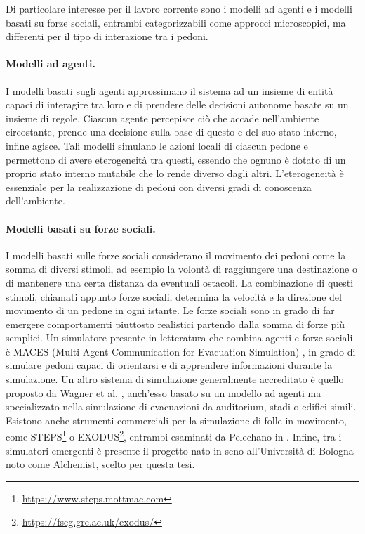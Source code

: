 \documentclass[12pt,a4paper,openright,oneside]{book}
\begin{document}
Di particolare interesse per il lavoro corrente sono i modelli ad agenti e i modelli basati su forze sociali, entrambi categorizzabili come approcci microscopici, ma differenti per il tipo di interazione tra i pedoni.
\paragraph{Modelli ad agenti.} I modelli basati sugli agenti approssimano il sistema ad un insieme di entità capaci di interagire tra loro e di prendere delle decisioni autonome basate su un insieme di regole. Ciascun agente percepisce ciò che accade nell’ambiente circostante, prende una decisione sulla base di questo e del suo stato interno, infine agisce. Tali modelli simulano le azioni locali di ciascun pedone e permettono di avere eterogeneità tra questi, essendo che ognuno è dotato di un proprio stato interno mutabile che lo rende diverso dagli altri. L’eterogeneità è essenziale per la realizzazione di pedoni con diversi gradi di conoscenza dell’ambiente. 
\paragraph{Modelli basati su forze sociali.} I modelli basati sulle forze sociali \cite{HelbingSocialForce1998} considerano il movimento dei pedoni come la somma di diversi stimoli, ad esempio la volontà di raggiungere una destinazione o di mantenere una certa distanza da eventuali ostacoli. La combinazione di questi stimoli, chiamati appunto forze sociali, determina la velocità e la direzione del movimento di un pedone in ogni istante. Le forze sociali sono in grado di far emergere comportamenti piuttosto realistici partendo dalla somma di forze più semplici.
\newline
\newline
Un simulatore presente in letteratura che combina agenti e forze sociali è MACES (Multi-Agent Communication for Evacuation Simulation) \cite{PelechanoMaces2006}, in grado di simulare pedoni capaci di orientarsi e di apprendere informazioni durante la simulazione. Un altro sistema di simulazione generalmente accreditato è quello proposto da Wagner et al. \cite{Wagner2014}, anch'esso basato su un modello ad agenti ma specializzato nella simulazione di evacuazioni da auditorium, stadi o edifici simili. Esistono anche strumenti commerciali per la simulazione di folle in movimento, come STEPS\footnote{\url{https://www.steps.mottmac.com}} o EXODUS\footnote{\url{https://fseg.gre.ac.uk/exodus/}}, entrambi esaminati da Pelechano in \cite{Pelechano2008}. Infine, tra i simulatori emergenti è presente il progetto nato in seno all'Università di Bologna noto come Alchemist, scelto per questa tesi.
\end{document}
